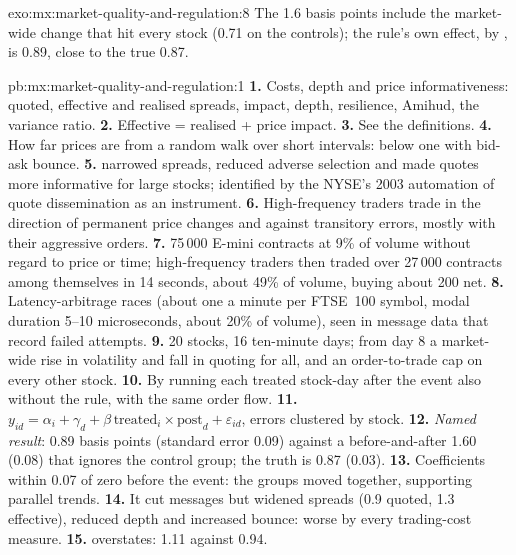 \begin{solution}{exo:mx:market-quality-and-regulation:8}
The 1.6 basis points include the market-wide change that hit every stock (0.71 on the controls); the rule's own effect, by ,
is 0.89, close to the true 0.87.
\end{solution}

\begin{solution}{pb:mx:market-quality-and-regulation:1}
\textbf{1.} Costs, depth and price informativeness: quoted, effective and realised spreads, impact, depth, resilience, Amihud, the variance ratio.
\textbf{2.} Effective = realised + price impact.
\textbf{3.} See the definitions.
\textbf{4.} How far prices are from a random walk over short intervals: below one with bid-ask bounce.
\textbf{5.}  narrowed spreads, reduced adverse selection and made quotes more informative for large stocks; identified by the NYSE's
2003 automation of quote dissemination as an instrument.
\textbf{6.} High-frequency traders trade in the direction of permanent price changes and against transitory errors, mostly with their aggressive orders.
\textbf{7.} 75\,000 E-mini contracts at 9\% of volume without regard to price or time; high-frequency traders then traded over 27\,000 contracts among
themselves in 14 seconds, about 49\% of volume, buying about 200 net.
\textbf{8.} Latency-arbitrage races (about one a minute per FTSE~100 symbol, modal duration 5--10 microseconds, about 20\% of volume), seen in message data
that record failed attempts.
\textbf{9.} 20 stocks, 16 ten-minute days; from day 8 a market-wide rise in volatility and fall in quoting for all, and an order-to-trade cap on every
other stock.
\textbf{10.} By running each treated stock-day after the event also without the rule, with the same order flow.
\textbf{11.} $y_{id}=\alpha_i+\gamma_d+\beta\,\text{treated}_i\times\text{post}_d+\varepsilon_{id}$, errors clustered by stock.
\textbf{12.} \emph{Named result}:  0.89 basis points (standard error 0.09) against a before-and-after 1.60 (0.08) that ignores
the control group; the truth is 0.87 (0.03).
\textbf{13.} Coefficients within 0.07 of zero before the event: the groups moved together, supporting parallel trends.
\textbf{14.} It cut messages but widened spreads (0.9 quoted, 1.3 effective), reduced depth and increased bounce: worse by every trading-cost
measure.
\textbf{15.}  overstates: 1.11 against 0.94.

\end{solution}
